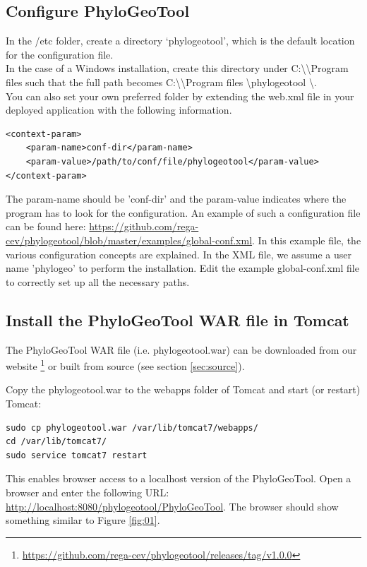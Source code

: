 \documentclass[a4paper, 11pt]{article} %
\begin{document}
\subsection{Configure PhyloGeoTool} \label{sssec:config_file}

In the /etc folder, create a directory `phylogeotool', which is the default location for the configuration file. 
\\
In the case of a Windows installation, create this directory under C:\textbackslash \textbackslash Program files such that the full path becomes C:\textbackslash \textbackslash Program files \textbackslash phylogeotool \textbackslash.
\\
You can also set your own preferred folder by extending the web.xml file in your deployed application with the following information.

\begin{verbatim}
<context-param>
    <param-name>conf-dir</param-name>
    <param-value>/path/to/conf/file/phylogeotool</param-value>
</context-param>
\end{verbatim}

The param-name should be 'conf-dir' and the param-value indicates where the program has to look for the configuration.
An example of such a configuration file can be found here: \url{https://github.com/rega-cev/phylogeotool/blob/master/examples/global-conf.xml}. 
In this example file, the various configuration concepts are explained.
In the XML file, we assume a user name 'phylogeo' to perform the installation.
Edit the example global-conf.xml file to correctly set up all the necessary paths.


\subsection{Install the PhyloGeoTool WAR file in Tomcat}
The PhyloGeoTool WAR file (i.e. phylogeotool.war) can be downloaded from our website \footnote{\url{https://github.com/rega-cev/phylogeotool/releases/tag/v1.0.0}} or built from source (see section \ref{sec:source}). 

Copy the phylogeotool.war to the webapps folder of Tomcat and start (or restart) Tomcat:
\begin{verbatim}
sudo cp phylogeotool.war /var/lib/tomcat7/webapps/
cd /var/lib/tomcat7/
sudo service tomcat7 restart
\end{verbatim}
This enables browser access to a localhost version of the PhyloGeoTool.
Open a browser and enter the following URL: \url{http://localhost:8080/phylogeotool/PhyloGeoTool}.
The browser should show something similar to Figure \ref{fig:01}.
\end{document}
